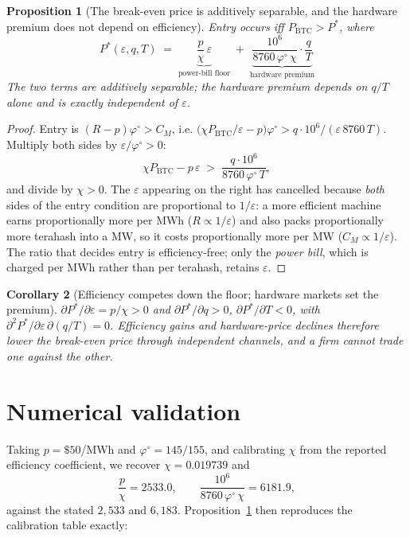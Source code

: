 \documentclass[11pt,reqno]{amsart}
\theoremstyle{plain}\newtheorem{proposition}{Proposition}\newtheorem{corollary}[proposition]{Corollary}
\theoremstyle{remark}\newtheorem{remark}[proposition]{Remark}
\newcommand{\CM}{C_M}\newcommand{\CF}{C_F}\newcommand{\bp}{\beta+p}
\newcommand{\phio}{\varphi^{\circ}}\newcommand{\CMbar}{\bar C_M}\newcommand{\eqdef}{\vcentcolon=}
\begin{document}
\begin{proposition}[The break-even price is additively separable, and the hardware premium
does not depend on efficiency]\label{prop:sep}
Entry occurs iff $P_{\mathrm{BTC}}>P^{*}$, where
\[
  \boxed{\;P^{*}(\varepsilon,q,T)\;=\;\underbrace{\frac{p}{\chi}\,\varepsilon}_{\text{power-bill floor}}
  \;+\;\underbrace{\frac{10^{6}}{8760\,\phio\,\chi}\cdot\frac{q}{T}}_{\text{hardware premium}}\;}
\]
The two terms are additively separable; the hardware premium depends on $q/T$ alone and is
\emph{exactly} independent of $\varepsilon$.
\end{proposition}
\begin{proof}
Entry is $(R-p)\phio>\CM$, i.e.
$\big(\chi P_{\mathrm{BTC}}/\varepsilon-p\big)\phio>q\cdot10^{6}/(\varepsilon\,8760\,T)$.
Multiply both sides by $\varepsilon/\phio>0$:
\[
  \chi P_{\mathrm{BTC}}-p\,\varepsilon\;>\;\frac{q\cdot10^{6}}{8760\,\phio\,T},
\]
and divide by $\chi>0$. The $\varepsilon$ appearing on the right has cancelled because
\emph{both} sides of the entry condition are proportional to $1/\varepsilon$: a more
efficient machine earns proportionally more per MWh ($R\propto1/\varepsilon$) and also
packs proportionally more terahash into a MW, so it costs proportionally more per MW
($\CM\propto1/\varepsilon$). The ratio that decides entry is efficiency-free; only the
\emph{power bill}, which is charged per MWh rather than per terahash, retains $\varepsilon$.
\end{proof}

\begin{corollary}[Efficiency competes down the floor; hardware markets set the premium]
$\partial P^{*}/\partial\varepsilon=p/\chi>0$ and $\partial P^{*}/\partial q>0$,
$\partial P^{*}/\partial T<0$, with $\partial^{2}P^{*}/\partial\varepsilon\,\partial(q/T)=0$.
Efficiency gains and hardware-price declines therefore lower the break-even price through
\emph{independent} channels, and a firm cannot trade one against the other.
\end{corollary}

\section{Numerical validation}
Taking $p=\$50$/MWh and $\phio=145/155$, and calibrating $\chi$ from the reported
efficiency coefficient, we recover $\chi=0.019739$ and
\[
  \frac{p}{\chi}=2533.0,\qquad \frac{10^{6}}{8760\,\phio\,\chi}=6181.9,
\]
against the stated $2{,}533$ and $6{,}183$. Proposition~\ref{prop:sep} then reproduces the
calibration table exactly:
\end{document}
